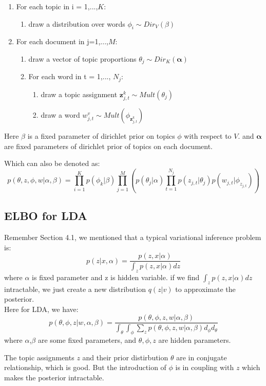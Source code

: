 \documentclass{article}
\begin{document}
\begin{enumerate}
\item 
{ For each topic in i = 1,...,$K$: 
\begin{enumerate}
\item draw a distribution over words $\phi_{i} \sim Dir_{V}(\beta)$
\end{enumerate}
}
\item
{ For each document in j=1,...,$M$:
\begin{enumerate}
\item draw a vector of topic proportions $\theta_{j} \sim Dir_{K}(\bm{\alpha})$
\item For each word in t = 1,..., $N_{j}$:
{
\begin{enumerate}
\item  draw a topic assignment $\bm{z}_{j,t}^{k} \sim Mult(\theta_{j})$
\item draw a word $w_{j,t}^{v} \sim Mult(\phi_{\bm{z}_{j,t}^{k}})$
\end{enumerate}
}
\end{enumerate}
}
\end{enumerate}
Here $\beta$ is a fixed parameter of dirichlet prior on topics $\phi$ with respect to $V$. and $\bm{\alpha}$ are fixed parameters of dirichlet prior of topics on each document.

Which can also be denoted as:
$$p(\theta,z,\phi,w|\alpha,\beta)=\prod_{i=1}^{K} p(\phi_{k}|\beta)\prod_{j=1}^{M}\left( p(\theta_{j}|\alpha)\prod_{t=1}^{N_{j}} p(z_{j,t}|\theta_{j})p(w_{j,t}|\phi_{z_{j,t}})\right)$$

\subsection{ELBO for LDA}
Remember Section 4.1, we mentioned that a typical variational inference problem is: 
$$p(z|x,\alpha)=\frac{p(z,x|\alpha)}{\int_z p(z,x|\alpha)dz}$$
where $\alpha$ is fixed parameter and z is hidden variable. if we find $\int_z p(z,x|\alpha)dz$ intractable, we just create a new distribution $q(z|v)$ to approximate the posterior.\\
\noindent
Here for LDA, we have:
$$p(\theta,\phi,z|w,\alpha,\beta) = \frac{p(\theta,\phi,z,w|\alpha,\beta)}{\int_{\theta} \int_{\phi} \sum_{z} p(\theta,\phi,z,w|\alpha,\beta)d_{\phi}d_{\theta} }$$
where $\alpha$,$\beta$ are some fixed parameters, and $\theta,\phi,z$ are hidden parameters. 

The topic assignments $z$ and their prior distirbution $\theta$ are in conjugate relationship, which is good. But the introduction of $\phi$ is in coupling with $z$ which makes the posterior intractable.
\end{document}
